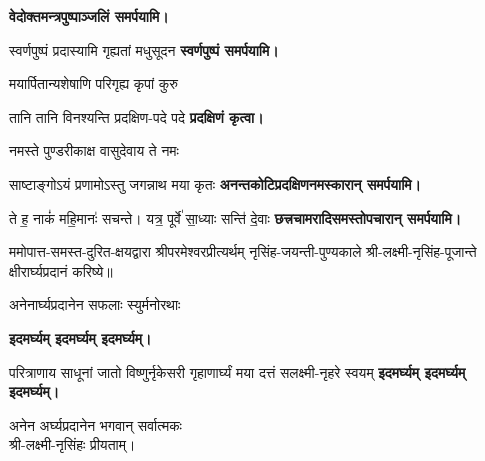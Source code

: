 \begin{center}
\medskip

\textbf{\devAya{} वेदोक्तमन्त्रपुष्पाञ्जलिं समर्पयामि।}\medskip

{स्वर्णपुष्पं प्रदास्यामि गृह्यतां मधुसूदन}
\textbf{\devAya{} स्वर्णपुष्पं समर्पयामि।}\medskip

{मयार्पितान्यशेषाणि परिगृह्य कृपां कुरु}

{तानि तानि विनश्यन्ति प्रदक्षिण-पदे पदे}
\textbf{प्रदक्षिणं कृत्वा।}
\medskip

{नमस्ते पुण्डरीकाक्ष वासुदेवाय ते नमः}

{साष्टाङ्गोऽयं प्रणामोऽस्तु जगन्नाथ मया कृतः}
\textbf{\devAya{} अनन्तकोटिप्रदक्षिणनमस्कारान् समर्पयामि।}\medskip

{ते ह॒ नाकं॑ महि॒मानः॑ सचन्ते। यत्र॒ पूर्वे॑ सा॒ध्याः सन्ति॑ दे॒वाः}
\textbf{\devAya{} छत्त्रचामरादिसमस्तोपचारान् समर्पयामि।}\medskip

\begin{center}




\end{center}

ममोपात्त-समस्त-दुरित-क्षयद्वारा श्रीपरमेश्वरप्रीत्यर्थम् नृसिंह-जयन्ती-पुण्यकाले श्री-लक्ष्मी-नृसिंह-पूजान्ते क्षीरार्घ्यप्रदानं करिष्ये॥
\medskip

{अनेनार्घ्यप्रदानेन सफलाः स्युर्मनोरथाः\footnotemark} %


	\textbf{\devAya{} इदमर्घ्यम् इदमर्घ्यम् इदमर्घ्यम्।}\medskip


{परित्राणाय साधूनां जातो विष्णुर्नृकेसरी}
{गृहाणार्घ्यं मया दत्तं सलक्ष्मी-नृहरे स्वयम्}
	\textbf{\devAya{} इदमर्घ्यम् इदमर्घ्यम् इदमर्घ्यम्।}\medskip

अनेन अर्घ्यप्रदानेन भगवान् सर्वात्मकः\\ श्री-लक्ष्मी-नृसिंहः प्रीयताम्।\medskip


\end{center}
